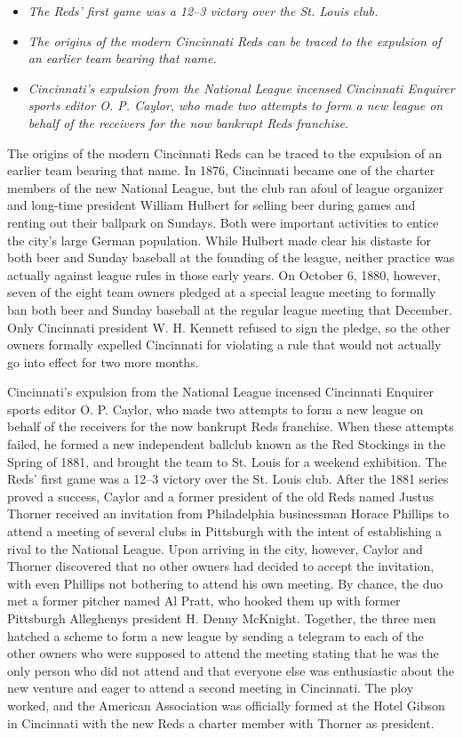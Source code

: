 \begin{itemize}
\item
  \emph{The Reds' first game was a 12--3 victory over the St. Louis
  club.}
\item
  \emph{The origins of the modern Cincinnati Reds can be traced to the
  expulsion of an earlier team bearing that name.}
\item
  \emph{Cincinnati's expulsion from the National League incensed
  Cincinnati Enquirer sports editor O. P. Caylor, who made two attempts
  to form a new league on behalf of the receivers for the now bankrupt
  Reds franchise.}
\end{itemize}

The origins of the modern Cincinnati Reds can be traced to the expulsion
of an earlier team bearing that name. In 1876, Cincinnati became one of
the charter members of the new National League, but the club ran afoul
of league organizer and long-time president William Hulbert for selling
beer during games and renting out their ballpark on Sundays. Both were
important activities to entice the city's large German population. While
Hulbert made clear his distaste for both beer and Sunday baseball at the
founding of the league, neither practice was actually against league
rules in those early years. On October 6, 1880, however, seven of the
eight team owners pledged at a special league meeting to formally ban
both beer and Sunday baseball at the regular league meeting that
December. Only Cincinnati president W. H. Kennett refused to sign the
pledge, so the other owners formally expelled Cincinnati for violating a
rule that would not actually go into effect for two more months.

Cincinnati's expulsion from the National League incensed Cincinnati
Enquirer sports editor O. P. Caylor, who made two attempts to form a new
league on behalf of the receivers for the now bankrupt Reds franchise.
When these attempts failed, he formed a new independent ballclub known
as the Red Stockings in the Spring of 1881, and brought the team to St.
Louis for a weekend exhibition. The Reds' first game was a 12--3 victory
over the St. Louis club. After the 1881 series proved a success, Caylor
and a former president of the old Reds named Justus Thorner received an
invitation from Philadelphia businessman Horace Phillips to attend a
meeting of several clubs in Pittsburgh with the intent of establishing a
rival to the National League. Upon arriving in the city, however, Caylor
and Thorner discovered that no other owners had decided to accept the
invitation, with even Phillips not bothering to attend his own meeting.
By chance, the duo met a former pitcher named Al Pratt, who hooked them
up with former Pittsburgh Alleghenys president H. Denny McKnight.
Together, the three men hatched a scheme to form a new league by sending
a telegram to each of the other owners who were supposed to attend the
meeting stating that he was the only person who did not attend and that
everyone else was enthusiastic about the new venture and eager to attend
a second meeting in Cincinnati. The ploy worked, and the American
Association was officially formed at the Hotel Gibson in Cincinnati with
the new Reds a charter member with Thorner as president.

